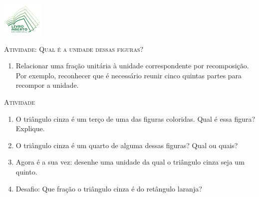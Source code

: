 \documentclass[10 pt,usenames,dvipsnames, oneside]{article}
\begin{document}
\begin{center}
  \begin{minipage}[l]{3cm}
\includegraphics[width=2cm]{../../../Figuras/logo}       
\end{minipage}\hfill
\begin{minipage}[r]{.8\textwidth}
 {\Large \scshape Atividade: Qual é a unidade dessas figuras?}  
\end{minipage}
\end{center}
\vspace{.2cm}

\ifdefined\prof
\begin{goals}
\begin{enumerate}

\item Relacionar uma fração unitária à unidade correspondente por recomposição. Por exemplo, reconhecer que é necessário reunir cinco quintas partes para recompor a unidade.

\end{enumerate}
\end{goals}

\bigskip
\begin{center}
{\large \scshape Atividade}
\end{center}
\fi


\begin{enumerate}[label=\alph*)]
\item O triângulo cinza é um terço de uma das figuras coloridas. Qual é essa figura? Explique. 
\item O triângulo cinza é um quarto de alguma dessas figuras? Qual ou quais?
\item Agora é a sua vez: desenhe uma unidade da qual o triângulo cinza seja um quinto.  
\item Desafio: Que fração o triângulo cinza é do retângulo laranja? 
\end{enumerate}
\end{document}
